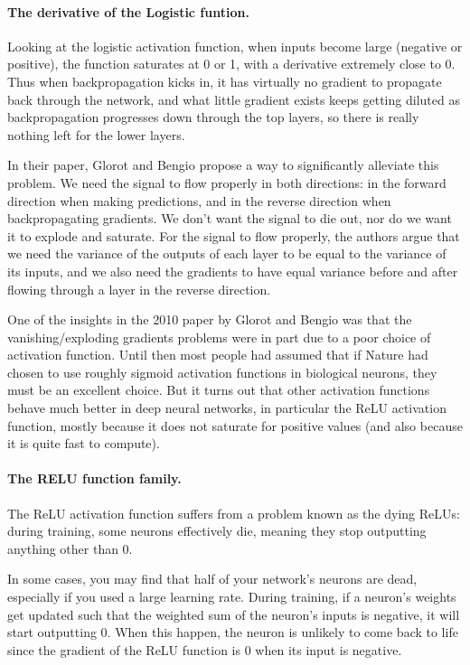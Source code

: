 \paragraph{The derivative of the Logistic funtion.}
Looking at the logistic activation function, when inputs become large
(negative or positive), the function saturates at 0 or 1, with a
derivative extremely close to 0. Thus when backpropagation kicks in,
it has virtually no gradient to propagate back through the network,
and what little gradient exists keeps getting diluted as
backpropagation progresses down through the top layers, so there is
really nothing left for the lower layers.

In their paper, Glorot and Bengio propose a way to significantly
alleviate this problem. We need the signal to flow properly in both
directions: in the forward direction when making predictions, and in
the reverse direction when backpropagating gradients. We don’t want
the signal to die out, nor do we want it to explode and saturate. For
the signal to flow properly, the authors argue that we need the
variance of the outputs of each layer to be equal to the variance of
its inputs, and we also need the gradients to have equal variance
before and after flowing through a layer in the reverse direction.

One of the insights in the 2010 paper by Glorot and Bengio was that
the vanishing/exploding gradients problems were in part due to a poor
choice of activation function. Until then most people had assumed that
if Nature had chosen to use roughly sigmoid activation functions in
biological neurons, they must be an excellent choice. But it turns out
that other activation functions behave much better in deep neural
networks, in particular the ReLU activation function, mostly because
it does not saturate for positive values (and also because it is quite
fast to compute).

\paragraph{The RELU function family.}
The ReLU activation function suffers from a problem known as the dying
ReLUs: during training, some neurons effectively die, meaning they
stop outputting anything other than 0.

In some cases, you may find that half of your network’s neurons are
dead, especially if you used a large learning rate. During training,
if a neuron’s weights get updated such that the weighted sum of the
neuron’s inputs is negative, it will start outputting 0. When this
happen, the neuron is unlikely to come back to life since the gradient
of the ReLU function is 0 when its input is negative.

